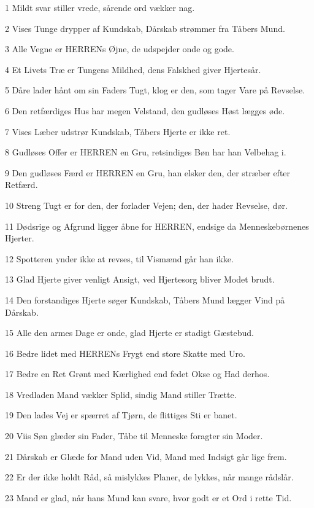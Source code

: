 \par 1 Mildt svar stiller vrede, sårende ord vækker nag.
\par 2 Vises Tunge drypper af Kundskab, Dårskab strømmer fra Tåbers Mund.
\par 3 Alle Vegne er HERRENs Øjne, de udspejder onde og gode.
\par 4 Et Livets Træ er Tungens Mildhed, dens Falskhed giver Hjertesår.
\par 5 Dåre lader hånt om sin Faders Tugt, klog er den, som tager Vare på Revselse.
\par 6 Den retfærdiges Hus har megen Velstand, den gudløses Høst lægges øde.
\par 7 Vises Læber udstrør Kundskab, Tåbers Hjerte er ikke ret.
\par 8 Gudløses Offer er HERREN en Gru, retsindiges Bøn har han Velbehag i.
\par 9 Den gudløses Færd er HERREN en Gru, han elsker den, der stræber efter Retfærd.
\par 10 Streng Tugt er for den, der forlader Vejen; den, der hader Revselse, dør.
\par 11 Dødsrige og Afgrund ligger åbne for HERREN, endsige da Menneskebørnenes Hjerter.
\par 12 Spotteren ynder ikke at revses, til Vismænd går han ikke.
\par 13 Glad Hjerte giver venligt Ansigt, ved Hjertesorg bliver Modet brudt.
\par 14 Den forstandiges Hjerte søger Kundskab, Tåbers Mund lægger Vind på Dårskab.
\par 15 Alle den armes Dage er onde, glad Hjerte er stadigt Gæstebud.
\par 16 Bedre lidet med HERRENs Frygt end store Skatte med Uro.
\par 17 Bedre en Ret Grønt med Kærlighed end fedet Okse og Had derhos.
\par 18 Vredladen Mand vækker Splid, sindig Mand stiller Trætte.
\par 19 Den lades Vej er spærret af Tjørn, de flittiges Sti er banet.
\par 20 Viis Søn glæder sin Fader, Tåbe til Menneske foragter sin Moder.
\par 21 Dårskab er Glæde for Mand uden Vid, Mand med Indsigt går lige frem.
\par 22 Er der ikke holdt Råd, så mislykkes Planer, de lykkes, når mange rådslår.
\par 23 Mand er glad, når hans Mund kan svare, hvor godt er et Ord i rette Tid.
